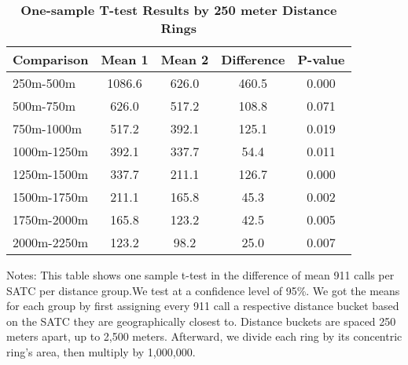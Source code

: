 \begin{table}[htbp]
\centering
\begin{tabular}{l|c c c c}
\hline
Comparison & Mean 1 & Mean 2 & Difference & P-value \\
\hline
250m-500m & 1086.6 & 626.0 & 460.5 & 0.000 \\
500m-750m & 626.0 & 517.2 & 108.8 & 0.071 \\
750m-1000m & 517.2 & 392.1 & 125.1 & 0.019 \\
1000m-1250m & 392.1 & 337.7 & 54.4 & 0.011 \\
1250m-1500m & 337.7 & 211.1 & 126.7 & 0.000 \\
1500m-1750m & 211.1 & 165.8 & 45.3 & 0.002 \\
1750m-2000m & 165.8 & 123.2 & 42.5 & 0.005 \\
2000m-2250m & 123.2 & 98.2 & 25.0 & 0.007 \\
\hline
\end{tabular}
\caption{\textbf{One-sample T-test Results by 250 meter Distance Rings}}
\label{tab:ttests_250}
\centering\footnotesize{ Notes: This table shows one sample t-test in the difference of mean 911 calls per SATC per distance group.We test at a confidence level of 95\%. We got the means
 for each group by first assigning every 911 call a respective distance bucket based on the SATC they are
 geographically closest to. Distance buckets are spaced 250 meters apart, up to 2,500 meters. Afterward, we
 divide each ring by its concentric ring’s area, then multiply by 1,000,000.}
\end{table}
